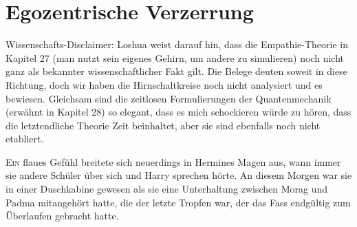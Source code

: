 \chapter{Egozentrische Verzerrung}

\begin{chapterOpeningAuthorNote}
%
Wissenschafts-Disclaimer: Loshua weist darauf hin, dass die Empathie-Theorie in Kapitel 27 (man nutzt sein eigenes Gehirn, um andere zu simulieren) noch nicht ganz als bekannter wissenschaftlicher Fakt gilt. Die Belege deuten soweit in diese Richtung, doch wir haben die Hirnschaltkreise noch nicht analysiert und es bewiesen. Gleichsam sind die zeitlosen Formulierungen der Quantenmechanik (erwähnt in Kapitel 28) so elegant, dass es mich schockieren würde zu hören, dass die letztendliche Theorie Zeit beinhaltet, aber sie sind ebenfalls noch nicht etabliert.
\end{chapterOpeningAuthorNote}

\lettrine{E}{in} flaues Gefühl breitete sich neuerdings in Hermines Magen aus, wann immer sie andere Schüler über sich und Harry sprechen hörte. An diesem Morgen war sie in einer Duschkabine gewesen als sie eine Unterhaltung zwischen Morag und Padma mitangehört hatte, die der letzte Tropfen war, der das Fass endgültig zum Überlaufen gebracht hatte.

